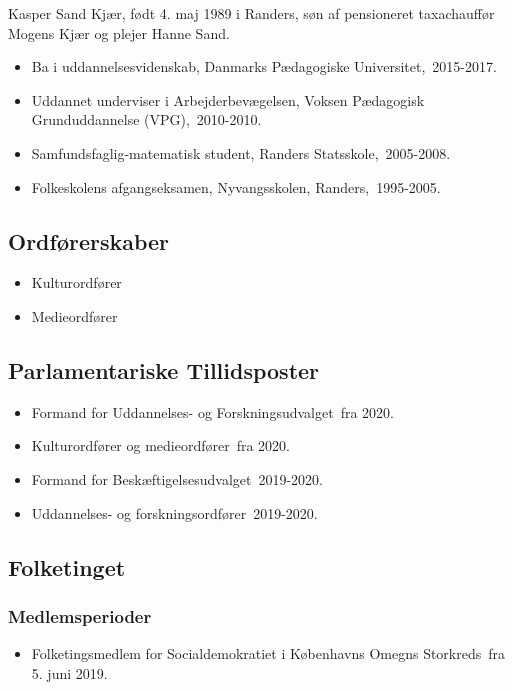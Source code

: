 \documentclass[11pt, a4paper]{awesome-cv}
\begin{document}
\makecvheader[R]
\makelettertitle
\begin{cvletter}
Kasper Sand Kjær, født 4. maj 1989 i Randers, søn af pensioneret taxachauffør Mogens Kjær og plejer Hanne Sand.

\begin{itemize}
\item Ba i uddannelsesvidenskab, Danmarks Pædagogiske Universitet, 2015-2017.
\item Uddannet underviser  i Arbejderbevægelsen,  Voksen Pædagogisk Grunduddannelse (VPG), 2010-2010.
\item Samfundsfaglig-matematisk student, Randers Statsskole, 2005-2008.
\item Folkeskolens afgangseksamen, Nyvangsskolen, Randers, 1995-2005.
\end{itemize}
\subsection*{Ordførerskaber}
\begin{itemize}
\item Kulturordfører
\item Medieordfører
\end{itemize}
\subsection*{Parlamentariske Tillidsposter}
\begin{itemize}
\item Formand for Uddannelses- og Forskningsudvalget fra 2020.
\item Kulturordfører og medieordfører fra 2020.
\item Formand for Beskæftigelsesudvalget 2019-2020.
\item Uddannelses- og forskningsordfører 2019-2020.
\end{itemize}
\subsection*{Folketinget}
\subsubsection*{Medlemsperioder}
\begin{itemize}
\item Folketingsmedlem for Socialdemokratiet i Københavns Omegns Storkreds fra 5. juni 2019.
\end{itemize}

\end{cvletter}
\end{document}
